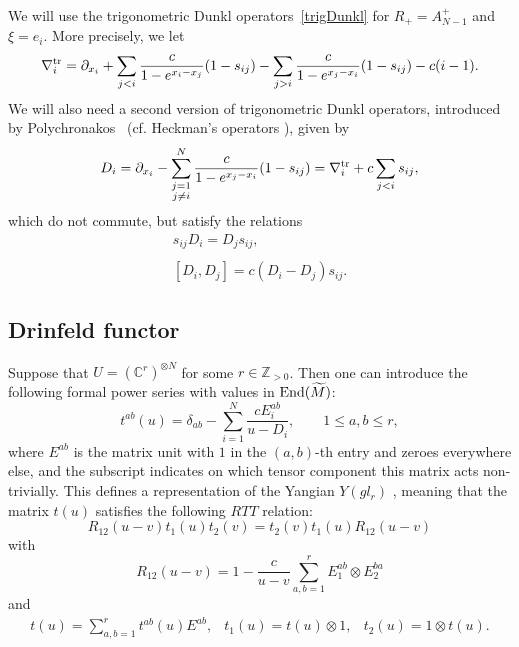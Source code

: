 \documentclass[12pt]{amsart}
\newcommand{\Z}{\mathbb Z}
\numberwithin{equation}{section}
\theoremstyle{definition}
\begin{document}
We will use the trigonometric Dunkl operators~\eqref{trigDunkl} for $R_+ = A_{N-1}^+$ and $\xi = e_i$. More precisely, we let
\begin{equation*}
    \nabla_i^{\rm tr} =  \partial_{x_i} + \sum\limits_{j < i} \frac{c}{1 - e^{x_i - x_j}} (1 - s_{ij}) - \sum\limits_{j > i} \frac{c}{1 - e^{x_j - x_i}} (1 - s_{ij}) - c (i-1).
\end{equation*}
We will also need a second version of trigonometric Dunkl operators, introduced by Polychronakos~\cite{Polych} (cf. Heckman's operators \cite{HeckmanTrig}), given by
\begin{equation*}
D_i = \partial_{x_i} - \sum\limits_{\substack{ j=1 \\ j \neq i}}^N \frac{c}{1 - e^{x_j - x_i}} (1 - s_{ij}) = \nabla_i^{\rm tr} + c \sum\limits_{j < i} s_{ij},
\end{equation*}
which do not commute, but satisfy the relations
\begin{equation*}
\begin{array}{c}
     \displaystyle{
     s_{ij} D_i = D_j s_{ij},
     }
     \\ \ \\
     \displaystyle{
     [D_i, D_j] = c (D_i - D_j)s_{ij}.
     }
\end{array}    
\end{equation*}
\subsection{Drinfeld functor}
Suppose that $U = (\mathbb{C}^r)^{\otimes N}$ for some $r \in \Z_{>0}$. Then one can introduce the following 
formal power series with values in ${\rm End}(\widetilde{M})$: 
\begin{equation}
\label{Yangian}
    t^{ab}(u) = \delta_{ab} - \sum\limits_{i = 1}^N \frac{c E^{ab}_i}{u - D_i}, \qquad 1 \leq a,b \leq r,
\end{equation}
where $E^{ab}$ is the matrix unit with $1$ in the $(a,b)$-th entry and zeroes everywhere else, and the subscript indicates on which tensor component this matrix acts non-trivially.
This defines a representation of the Yangian $Y(gl_r)$ \cite{D, A, BAB}, meaning that the matrix $t(u)$ satisfies the following $RTT$
relation:
\begin{equation*}
    R_{12}(u - v) t_1(u) t_2(v) = t_2(v) t_1(u) R_{12}(u - v)
\end{equation*}
with
\begin{equation*}
    R_{12}(u-v) = 1 - \frac{c}{u - v}\sum\limits_{a,b = 1}^r E_1^{ab}\otimes E_2^{ba}
\end{equation*}
and
\begin{equation*}
    \begin{array}{ccc}
    t(u) = \sum\limits_{a,b = 1}^r t^{ab}(u) E^{ab}, & t_1(u) = t(u) \otimes 1, & t_2(u) = 1 \otimes t(u).
    \end{array}
\end{equation*}
\end{document}

